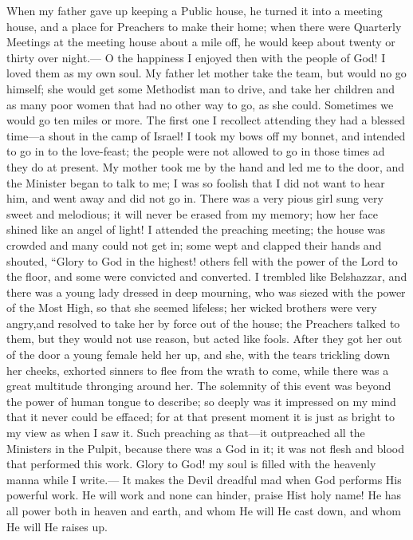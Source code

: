 When my father gave up keeping a Public house, he turned it into a meeting house, and a place for Preachers to make their home; when there were Quarterly Meetings at the meeting house about a mile off, he would keep about twenty or thirty over night.---%
O the happiness I enjoyed then with the people of God!
I loved them as my own soul.
My father let mother take the team, but would no go himself; she would get some Methodist man to drive, and take her children and as many poor women that had no other way to go, as she could.
Sometimes we would go ten miles or more.
The first one I recollect attending they had a blessed time---a shout in the camp of Israel!
I took my bows off my bonnet, and intended to go in to the love-feast; the people were not allowed to go in those times ad they do at present.
My mother took me by the hand and led me to the door, and the Minister began to talk to me; I was so foolish that I did not want to hear him, and went away and did not go in.
There was a very pious girl sung very sweet and melodious; it will never be erased from my memory; how her face shined like an angel of light!
I attended the preaching meeting; the house was crowded and many could not get in; some wept and clapped their hands and shouted, ``Glory to God in the  highest! others fell with the power of the Lord to the floor, and some were convicted and converted.
I trembled like Belshazzar, and there was a young lady dressed in deep mourning, who was siezed with the power of the Most High, so that she seemed lifeless; her wicked brothers were very angry,and resolved to take her by force out of the house; the Preachers talked to them, but they would not use reason, but acted like fools.
After they got her out of the door a young female held her up, and she, with the tears trickling down her cheeks, exhorted sinners to flee from the wrath to come, while there was a great multitude thronging around her.
The solemnity of this event was beyond the power of human tongue to describe; so deeply was it impressed on my mind that it never could be effaced; for at that present moment it is just as bright to my view as when I saw it.
Such preaching as that---it outpreached all the Ministers in the Pulpit, because there was a God in it; it was not flesh and blood that performed this work.
Glory to God! my soul is filled with the heavenly manna while I write.---%
It makes the Devil dreadful mad when God performs His powerful work.
He will work and none can hinder, praise Hist holy name!
He has all power both in heaven and earth, and whom He will He cast down, and whom He will He raises up.

